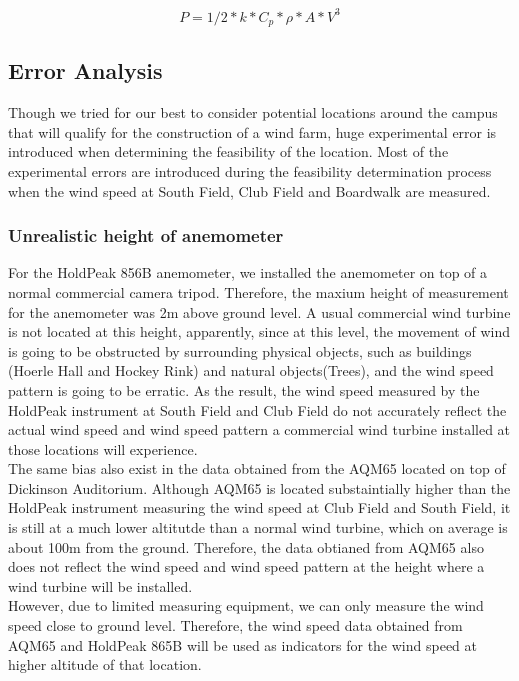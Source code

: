 \documentclass[review]{elsarticle}
\begin{document}
\begin{equation}
    P=1/2*k*C_{p}*\rho*A*V^3
\end{equation}


\subsection{Error Analysis}
\label{sec:analysis:erroranalysis}

Though we tried for our best to consider potential locations around the campus that will qualify for the construction of a wind farm, huge experimental error is introduced when determining 
the feasibility of the location. Most of the experimental errors are introduced during the feasibility determination process when the wind speed at South Field, Club Field and Boardwalk are measured.

\subsubsection{Unrealistic height of anemometer}
\label{sec:analysis:erroranalysis:unrealisticheight}
For the HoldPeak 856B anemometer, we installed the anemometer on top of a normal commercial camera tripod. Therefore, the maxium height of measurement for the anemometer was 2m above ground level. 
A usual commercial wind turbine is not located at this height, apparently, since at this level, the movement of wind is going to be obstructed by surrounding physical objects, such as buildings 
(Hoerle Hall and Hockey Rink) and natural objects(Trees), and the wind speed pattern is going to be erratic. As the result, the wind speed measured by the HoldPeak instrument at South Field and 
Club Field do not accurately reflect the actual wind speed and wind speed pattern a commercial wind turbine installed at those locations will experience. 
\\\indent The same bias also exist in the data obtained from the AQM65 located on top of Dickinson Auditorium. Although AQM65 is located substaintially higher than the HoldPeak instrument measuring 
the wind speed at Club Field and South Field, it is still at a much lower altitutde than a normal wind turbine, which on average is about 100m from the ground. Therefore, the data obtianed from 
AQM65 also does not reflect the wind speed and wind speed pattern at the height where a wind turbine will be installed. 
\\\indent However, due to limited measuring equipment, we can only measure the wind speed close to ground level. Therefore, 
the wind speed data obtained from AQM65 and HoldPeak 865B will be used as indicators for the wind speed at higher altitude of that location.
\end{document}
